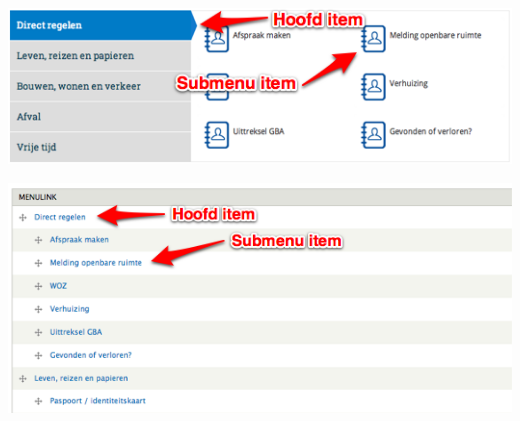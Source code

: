 \bigskip

\begin{center}
	\includegraphics[width=\textwidth]{img/menu_toptaken.png}
\end{center}

\begin{center}
	\includegraphics[width=\textwidth]{img/menu_toptaken2.png}
\end{center}